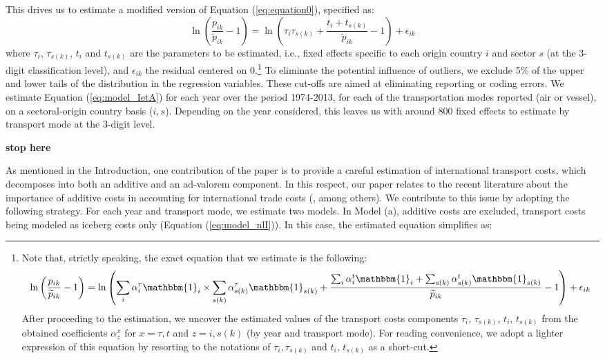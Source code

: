 \documentclass[a4paper,11pt]{article}
\begin{document}
This drives us to estimate a modified version of Equation (\ref{eq:equation0}), specified as:
\begin{equation}
\ln\left(\frac{p_{ik}}{\widetilde{p}_{ik}}-1 \right)= \ln \left(\tau_{i} \tau_{s(k)}+\frac{t_{i} + t_{s(k)}}{\widetilde{p}_{ik}}-1 \right) + \epsilon_{ik} \label{eq:model_IetA}
\end{equation}
where $\tau_{i}$, $\tau_{s(k)}$, $t_{i}$ and $t_{s(k)}$ are the parameters to be estimated, i.e., fixed effects specific to each origin country $i$ and sector $s$ (at the 3-digit classification level), and $\epsilon_{ik}$ the residual centered on 0.\footnote{Note that, strictly speaking, the exact equation that we estimate is the following:
$$\ln\left(\frac{p_{ik}}{\widetilde{p}_{ik}}-1 \right)= \ln \left(\sum_i \alpha_i^\tau \mathbbm{1}_i \times \sum_{s(k)}\alpha_{s(k)}^\tau \mathbbm{1}_{s(k)}+ \frac{\sum_i\alpha_i^t\mathbbm{1}_i + \sum_{s(k)}\alpha^t_{s(k)}\mathbbm{1}_{s(k)}}{\widetilde{p}_{ik}}-1\right)+\epsilon_{ik} $$
After proceeding to the estimation, we uncover the estimated values of the transport costs components $\tau_{i}$, $\tau_{s(k)}$, $t_{i}$, $t_{s(k)}$ from the obtained coefficients $\alpha^{x}_{z}$ for $x=\tau,t$ and $z=i,s(k)$ (by year and transport mode).
For reading convenience, we adopt a lighter expression of this equation by resorting to the notations of $\tau_i,\tau_{s(k)}$ and $t_i$, $t_{s(k)}$ as a short-cut.}  To eliminate the potential influence of outliers, we exclude 5\% of the upper and lower tails of the distribution in the regression variables.
These cut-offs are aimed at eliminating reporting or coding errors.
We estimate Equation (\ref{eq:model_IetA}) for each year over the period 1974-2013, for each of the transportation modes reported (air or vessel), on a sectoral-origin country basis ($i,s$).
Depending on the year considered, this leaves us with around 800 fixed effects to estimate by transport mode at the 3-digit level.
  \medskip

\textbf{stop here}


As mentioned in the Introduction, one contribution of the paper is to provide a careful estimation of international transport costs, which decomposes into both an additive and an ad-valorem component.
In this respect, our paper relates to the recent literature about the importance of additive costs in accounting for international trade costs (\citealp{Irrazabal_2015}, among others).
We contribute to this issue by adopting the following strategy.
For each year and transport mode, we estimate two models.
In Model (a), additive costs are excluded, transport costs being modeled as iceberg costs only (Equation (\ref{eq:model_nlI})).
In this case, the estimated equation simplifies as:
\end{document}
